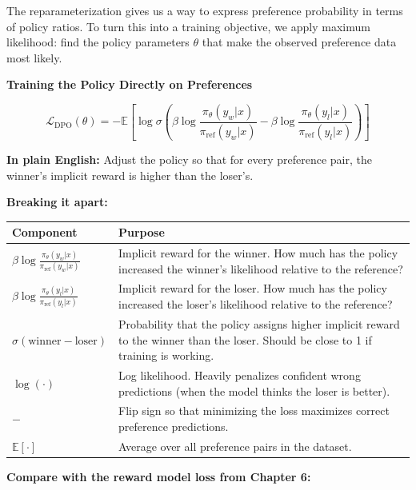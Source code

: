 \begin{chapterenv}
The reparameterization gives us a way to express preference probability in terms of policy ratios. To turn this into a training objective, we apply maximum likelihood: find the policy parameters $\theta$ that make the observed preference data most likely.

\begin{infobox}
\textbf{Training the Policy Directly on Preferences}

$$\mathcal{L}_{\text{DPO}}(\theta) = -\mathbb{E}\!\left[\log \sigma\!\left(\beta \log \frac{\pi_\theta(y_w|x)}{\pi_{\text{ref}}(y_w|x)} - \beta \log \frac{\pi_\theta(y_l|x)}{\pi_{\text{ref}}(y_l|x)}\right)\right]$$

\textbf{In plain English:} Adjust the policy so that for every preference pair, the winner's implicit reward is higher than the loser's.
\end{infobox}

\textbf{Breaking it apart:}

\begin{center}
\begin{tabular}{p{}p{}}
\toprule
\textbf{Component} & \textbf{Purpose} \\
\midrule
$\beta \log \frac{\pi_\theta(y_w|x)}{\pi_{\text{ref}}(y_w|x)}$ & Implicit reward for the winner. How much has the policy increased the winner's likelihood relative to the reference? \\
$\beta \log \frac{\pi_\theta(y_l|x)}{\pi_{\text{ref}}(y_l|x)}$ & Implicit reward for the loser. How much has the policy increased the loser's likelihood relative to the reference? \\
$\sigma(\text{winner} - \text{loser})$ & Probability that the policy assigns higher implicit reward to the winner than the loser. Should be close to 1 if training is working. \\
$\log(\cdot)$ & Log likelihood. Heavily penalizes confident wrong predictions (when the model thinks the loser is better). \\
$-$ & Flip sign so that minimizing the loss maximizes correct preference predictions. \\
$\mathbb{E}[\cdot]$ & Average over all preference pairs in the dataset. \\
\bottomrule
\end{tabular}
\end{center}

\begin{infobox}
\textbf{Compare with the reward model loss from Chapter 6:}


\end{infobox}
\end{chapterenv}
